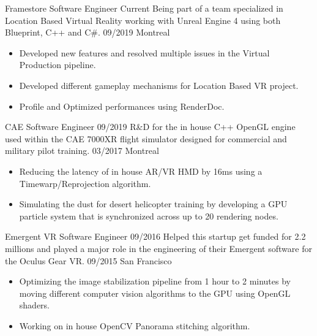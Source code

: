 %
%
%

\begin{experiences}
  \experience
    {Framestore}   			{Software Engineer}
    {Current} 			{Being part of a team specialized in Location Based Virtual Reality working with Unreal Engine 4 using both Blueprint, C++ and C\#.}
	{09/2019}	 	
	{Montreal}			{
						  \begin{itemize}
							\item Developed new features and resolved multiple issues in the Virtual Production pipeline.
							\item Developed different gameplay mechanisms for Location Based VR project.
							\item Profile and Optimized performances using RenderDoc.
						  \end{itemize}
						 }
   \emptySeparator

  \experience
    {CAE}   				{Software Engineer}
    {09/2019} 			{R\&D for the in house C++ OpenGL engine used within the CAE 7000XR flight simulator designed for commercial and military pilot training.}
	{03/2017}	 	
	{Montreal}			{
						  \begin{itemize}
							\item Reducing the latency of in house AR/VR HMD by 16ms using a Timewarp/Reprojection algorithm.
							\item Simulating the dust for desert helicopter training by developing a GPU particle system that is synchronized across up to 20 rendering nodes.
						  \end{itemize}
						 }
   \emptySeparator
   
   \experience
    {Emergent VR} 			{Software Engineer}
    {09/2016} 				{Helped this startup get funded for 2.2 millions and played a major role in the engineering of their Emergent software for the Oculus Gear VR.}
	{09/2015}	 	
	{San Francisco}			{
						  \begin{itemize}
							\item Optimizing the image stabilization pipeline from 1 hour to 2 minutes by moving different computer vision algorithms to the GPU using OpenGL shaders.
							\item Working on in house OpenCV Panorama stitching algorithm.
						  \end{itemize}
						 }
   \emptySeparator
   

\end{experiences}
